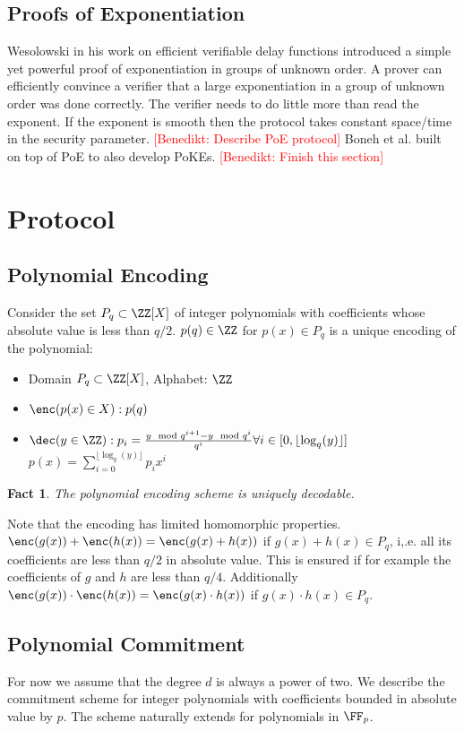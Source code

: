 \documentclass{article}
\newtheorem{fact}{Fact}
\newcommand{\benedikt}[1]{{\textcolor{red}{[Benedikt: #1]}}}
\newcommand{\benedikt}[1]{}
\begin{document}
\subsection{Proofs of Exponentiation}
Wesolowski \cite{EC:Wesolowski19} in his work on efficient verifiable delay functions introduced a simple yet powerful proof of exponentiation in groups of unknown order. A prover can efficiently convince a verifier that a large exponentiation in a group of unknown order was done correctly. The verifier needs to do little more than read the exponent. If the exponent is smooth then the protocol takes constant space/time in the security parameter.
\benedikt{Describe PoE protocol}
Boneh et al. \cite{journals/iacr/BonehBF18a} built on top of PoE to also develop PoKEs. \benedikt{Finish this section}
\section{Protocol}
\label{sec:protocol}

\subsection{Polynomial Encoding}

	Consider the set $P_q\subset \ZZ[X]$ of integer polynomials with coefficients whose absolute value is less than $q/2$. $p(q) \in \ZZ$ for $p(x)\in P_q$ is a unique encoding of the polynomial:
\begin{itemize}
	\item Domain $P_q \subset \ZZ[X]$, Alphabet: $\ZZ$
	\item $\enc(p(x) \in X): p(q)$
	\item $\dec(y \in \ZZ): p_i=\frac{y \mod q^{i+1}-y \mod q^{i}}{q^i} \forall i \in [0,\lfloor\log_q(y)\rfloor]$\\
	$p(x)=\sum_{i=0}^{\lfloor\log_q(y)\rfloor} p_i x^i$
\end{itemize}

\begin{fact}
	The polynomial encoding scheme is uniquely decodable.
\end{fact}

Note that the encoding has limited homomorphic properties. $\enc(g(x))+\enc(h(x))=\enc(g(x)+h(x))$ if $g(x)+h(x)\in P_q$, i,.e. all its coefficients are less than $q/2$ in absolute value. This is ensured if for example the coefficients of $g$ and $h$ are less than $q/4$. Additionally $\enc(g(x))\cdot \enc(h(x))=\enc(g(x)\cdot h(x))$ if $g(x)\cdot h(x)\in P_q$.
\subsection{Polynomial Commitment}
 For now we assume that the degree $d$ is always a power of two. We describe the commitment scheme for integer polynomials with coefficients bounded in absolute value by $p$. The scheme naturally extends for polynomials in $\FF_p$.
\end{document}

